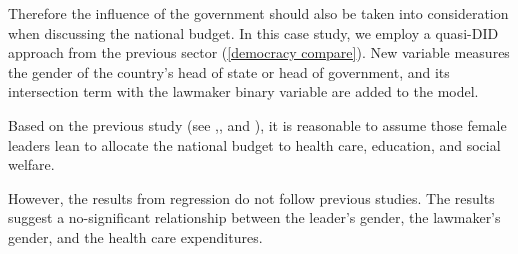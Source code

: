 Therefore the influence of the government should also be taken into consideration when discussing the national budget.
In this case study, we employ a quasi-DID approach from the previous sector (\ref{democracy compare}).
New variable measures the gender of the country's head of state or head of government, and its intersection term with the lawmaker binary variable are added to the model.

Based on the previous study (see ,, and ), it is reasonable to assume those female leaders lean to allocate the national budget to health care, education, and social welfare. 

However, the results from regression do not follow previous studies.
The results suggest a no-significant relationship between the leader's gender, the lawmaker's gender, and the health care expenditures.

